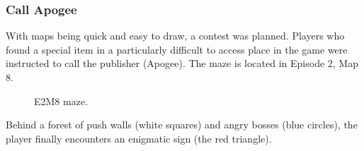 \subsubsection{Call Apogee}
With maps being quick and easy to draw, a contest was planned. Players who found a special item in a particularly difficult to access place in the game were instructed to call the publisher (Apogee). The maze is located in Episode 2, Map 8.\\
\par
\begin{figure}[H]
  \centering
 \caption{E2M8 maze.}
\end{figure}

\par
Behind a forest of push walls (white squares) and angry bosses (blue circles), the player finally encounters an enigmatic sign (the red triangle).

